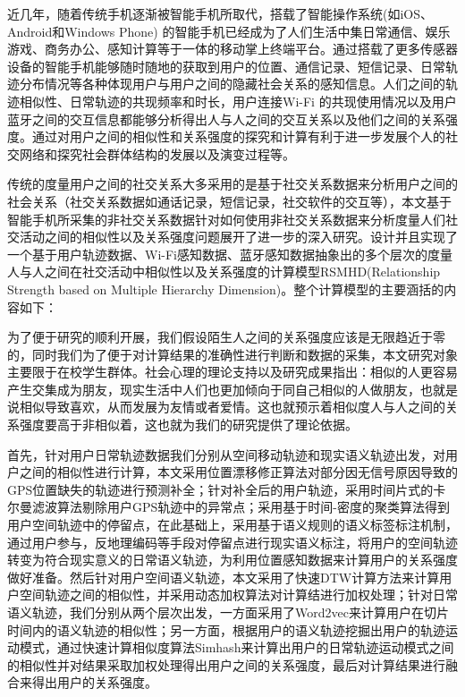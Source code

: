 \begin{cabstract}
近几年，随着传统手机逐渐被智能手机所取代，搭载了智能操作系统(如iOS、Android和Windows Phone) 的智能手机已经成为了人们生活中集日常通信、娱乐游戏、商务办公、感知计算等于一体的移动掌上终端平台。通过搭载了更多传感器设备的智能手机能够随时随地的获取到用户的位置、通信记录、短信记录、日常轨迹分布情况等各种体现用户与用户之间的隐藏社会关系的感知信息。人们之间的轨迹相似性、日常轨迹的共现频率和时长，用户连接Wi-Fi 的共现使用情况以及用户蓝牙之间的交互信息都能够分析得出人与人之间的交互关系以及他们之间的关系强度。通过对用户之间的相似性和关系强度的探究和计算有利于进一步发展个人的社交网络和探究社会群体结构的发展以及演变过程等。

传统的度量用户之间的社交关系大多采用的是基于社交关系数据来分析用户之间的社会关系（社交关系数据如通话记录，短信记录，社交软件的交互等），本文基于智能手机所采集的非社交关系数据针对如何使用非社交关系数据来分析度量人们社交活动之间的相似性以及关系强度问题展开了进一步的深入研究。设计并且实现了一个基于用户轨迹数据、Wi-Fi感知数据、蓝牙感知数据抽象出的多个层次的度量人与人之间在社交活动中相似性以及关系强度的计算模型RSMHD(Relationship Strength based on Multiple Hierarchy Dimension)。整个计算模型的主要涵括的内容如下：
\par 为了便于研究的顺利开展，我们假设陌生人之间的关系强度应该是无限趋近于零的，同时我们为了便于对计算结果的准确性进行判断和数据的采集，本文研究对象主要限于在校学生群体。社会心理的理论支持以及研究成果指出：相似的人更容易产生交集成为朋友，现实生活中人们也更加倾向于同自己相似的人做朋友，也就是说相似导致喜欢，从而发展为友情或者爱情。这也就预示着相似度人与人之间的关系强度要高于非相似着，这也就为我们的研究提供了理论依据。
\par 首先，针对用户日常轨迹数据我们分别从空间移动轨迹和现实语义轨迹出发，对用户之间的相似性进行计算，本文采用位置漂移修正算法对部分因无信号原因导致的GPS位置缺失的轨迹进行预测补全；针对补全后的用户轨迹，采用时间片式的卡尔曼滤波算法剔除用户GPS轨迹中的异常点；采用基于时间-密度的聚类算法得到用户空间轨迹中的停留点，在此基础上，采用基于语义规则的语义标签标注机制，通过用户参与，反地理编码等手段对停留点进行现实语义标注，将用户的空间轨迹转变为符合现实意义的日常语义轨迹，为利用位置感知数据来计算用户的关系强度做好准备。然后针对用户空间语义轨迹，本文采用了快速DTW计算方法来计算用户空间轨迹之间的相似性，并采用动态加权算法对计算结进行加权处理；针对日常语义轨迹，我们分别从两个层次出发，一方面采用了Word2vec来计算用户在切片时间内的语义轨迹的相似性；另一方面，根据用户的语义轨迹挖掘出用户的轨迹运动模式，通过快速计算相似度算法Simhash来计算出用户的日常轨迹运动模式之间的相似性并对结果采取加权处理得出用户之间的关系强度，最后对计算结果进行融合来得出用户的关系强度。\\

\end{cabstract}
